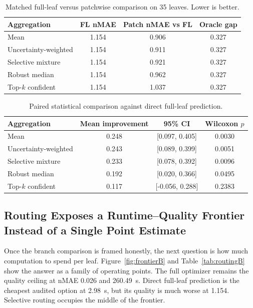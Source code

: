 \documentclass[11pt,a4paper]{article}
\newcommand{\nmae}{nMAE}
\begin{document}
\begin{table}[H]
\centering
\caption{Matched full-leaf versus patchwise comparison on 35 leaves. Lower is better.}
\label{tab:mainB}
\small
\begin{tabular}{lccc}
\toprule
Aggregation & FL \nmae{} & Patch \nmae{} vs FL & Oracle gap \\
\midrule
Mean & 1.154 & 0.906 & 0.327 \\
Uncertainty-weighted & 1.154 & 0.911 & 0.327 \\
Selective mixture & 1.154 & 0.921 & 0.327 \\
Robust median & 1.154 & 0.962 & 0.327 \\
Top-$k$ confident & 1.154 & 1.037 & 0.327 \\
\bottomrule
\end{tabular}
\end{table}

\begin{table}[H]
\centering
\caption{Paired statistical comparison against direct full-leaf prediction.}
\label{tab:statsB}
\small
\begin{tabular}{lccc}
\toprule
Aggregation & Mean improvement & 95\% CI & Wilcoxon $p$ \\
\midrule
Mean & 0.248 & [0.097, 0.405] & 0.0030 \\
Uncertainty-weighted & 0.243 & [0.089, 0.399] & 0.0051 \\
Selective mixture & 0.233 & [0.078, 0.392] & 0.0096 \\
Robust median & 0.192 & [0.020, 0.366] & 0.0495 \\
Top-$k$ confident & 0.117 & [-0.056, 0.288] & 0.2383 \\
\bottomrule
\end{tabular}
\end{table}

\subsection{Routing Exposes a Runtime--Quality Frontier Instead of a Single Point Estimate}
Once the branch comparison is framed honestly, the next question is how much computation to spend per leaf.
Figure~\ref{fig:frontierB} and Table~\ref{tab:routingB} show the answer as a family of operating points.
The full optimizer remains the quality ceiling at \nmae{} 0.026 and 260.49~s.
Direct full-leaf prediction is the cheapest audited option at 2.98~s, but its quality is much worse at 1.154.
Selective routing occupies the middle of the frontier.
\end{document}
